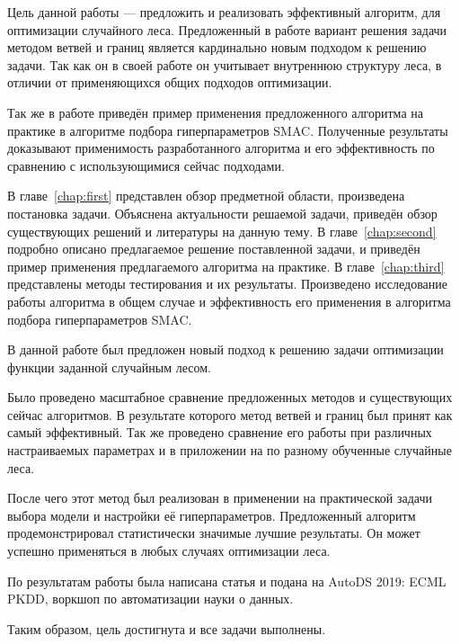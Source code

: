 \documentclass[pscyr,specification,annotation]{itmo-student-thesis}
\begin{document}
Цель данной работы --- предложить и реализовать эффективный алгоритм, для
оптимизации случайного леса. Предложенный в работе вариант решения задачи
методом ветвей и границ является кардинально новым подходом к решению задачи.
Так как он в своей работе он учитывает внутреннюю структуру леса, в отличии от
применяющихся общих подходов оптимизации.

Так же в работе приведён пример применения предложенного алгоритма на практике
в алгоритме подбора гиперпараметров SMAC\@. Полученные результаты доказывают
применимость разработанного алгоритма и его эффективность по сравнению
с использующимися сейчас подходами.

В главе~\ref{chap:first} представлен обзор предметной области, произведена
постановка задачи. Объяснена актуальности решаемой задачи, приведён обзор
существующих решений и литературы на данную тему. В главе~\ref{chap:second}
подробно описано предлагаемое решение поставленной задачи, и приведён пример
применения предлагаемого алгоритма на практике. В главе~\ref{chap:third}
представлены методы тестирования и их результаты. Произведено исследование
работы алгоритма в общем случае и эффективность его применения в алгоритма
подбора гиперпараметров SMAC\@.






\startconclusionpage{}
В данной работе был предложен новый подход к решению задачи оптимизации функции
заданной случайным лесом.

Было проведено масштабное сравнение предложенных методов и существующих сейчас
алгоритмов. В результате которого метод ветвей и границ был принят как самый
эффективный. Так же проведено сравнение его работы при различных настраиваемых
параметрах и в приложении на по разному обученные случайные леса.

После чего этот метод был реализован в применении на практической задачи выбора
модели и настройки её гиперпараметров. Предложенный алгоритм продемонстрировал
статистически значимые лучшие результаты. Он может успешно применяться в любых
случаях оптимизации леса.

По результатам работы была написана статья и подана на AutoDS 2019: ECML PKDD,
воркшоп по автоматизации науки о данных.

Таким образом, цель достигнута и все задачи выполнены.

\printmainbibliography%
\end{document}
